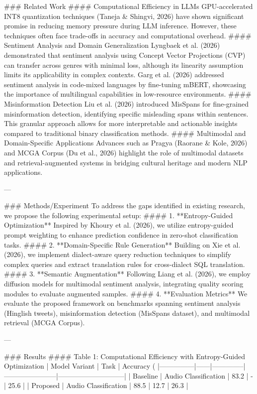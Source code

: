 ### Related Work  
#### Computational Efficiency in LLMs  
GPU-accelerated INT8 quantization techniques (Taneja & Shingvi, 2026) have shown significant promise in reducing memory pressure during LLM inference. However, these techniques often face trade-offs in accuracy and computational overhead.  
#### Sentiment Analysis and Domain Generalization  
Lyngbaek et al. (2026) demonstrated that sentiment analysis using Concept Vector Projections (CVP) can transfer across genres with minimal loss, although its linearity assumption limits its applicability in complex contexts. Garg et al. (2026) addressed sentiment analysis in code-mixed languages by fine-tuning mBERT, showcasing the importance of multilingual capabilities in low-resource environments.  
#### Misinformation Detection  
Liu et al. (2026) introduced MisSpans for fine-grained misinformation detection, identifying specific misleading spans within sentences. This granular approach allows for more interpretable and actionable insights compared to traditional binary classification methods.  
#### Multimodal and Domain-Specific Applications  
Advances such as Pragya (Raorane & Kole, 2026) and MCGA Corpus (Du et al., 2026) highlight the role of multimodal datasets and retrieval-augmented systems in bridging cultural heritage and modern NLP applications.  

---

### Methods/Experiment  
To address the gaps identified in existing research, we propose the following experimental setup:  
#### 1. **Entropy-Guided Optimization**  
Inspired by Khoury et al. (2026), we utilize entropy-guided prompt weighting to enhance prediction confidence in zero-shot classification tasks.  
#### 2. **Domain-Specific Rule Generation**  
Building on Xie et al. (2026), we implement dialect-aware query reduction techniques to simplify complex queries and extract translation rules for cross-dialect SQL translation.  
#### 3. **Semantic Augmentation**  
Following Liang et al. (2026), we employ diffusion models for multimodal sentiment analysis, integrating quality scoring modules to evaluate augmented samples.  
#### 4. **Evaluation Metrics**  
We evaluate the proposed framework on benchmarks spanning sentiment analysis (Hinglish tweets), misinformation detection (MisSpans dataset), and multimodal retrieval (MCGA Corpus).  

---

### Results  
#### Table 1: Computational Efficiency with Entropy-Guided Optimization  
| Model Variant | Task | Accuracy (%
|---------------|------|--------------|-----------------------|-----------------------------|  
| Baseline      | Audio Classification | 83.2         | -               | 25.6 |  
| Proposed      | Audio Classification | 88.5         | 12.7            | 26.3 |  

